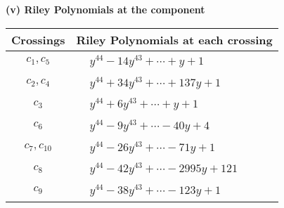 \documentclass[1p]{elsarticle_modified}
\theoremstyle{definition}
\begin{document}
\newpage\renewcommand{\arraystretch}{1}
\flushleft \textbf{(v) Riley Polynomials at the component}\newline \\
\begin{tabular}{m{50pt}|m{274pt}}
Crossings & \hspace{64pt}Riley Polynomials at each crossing \\
\hline $$\begin{aligned}c_{1},c_{5}\end{aligned}$$&$\begin{aligned}
&y^{44}-14 y^{43}+\cdots+y+1
\end{aligned}$\\
\hline $$\begin{aligned}c_{2},c_{4}\end{aligned}$$&$\begin{aligned}
&y^{44}+34 y^{43}+\cdots+137 y+1
\end{aligned}$\\
\hline $$\begin{aligned}c_{3}\end{aligned}$$&$\begin{aligned}
&y^{44}+6 y^{43}+\cdots+y+1
\end{aligned}$\\
\hline $$\begin{aligned}c_{6}\end{aligned}$$&$\begin{aligned}
&y^{44}-9 y^{43}+\cdots-40 y+4
\end{aligned}$\\
\hline $$\begin{aligned}c_{7},c_{10}\end{aligned}$$&$\begin{aligned}
&y^{44}-26 y^{43}+\cdots-71 y+1
\end{aligned}$\\
\hline $$\begin{aligned}c_{8}\end{aligned}$$&$\begin{aligned}
&y^{44}-42 y^{43}+\cdots-2995 y+121
\end{aligned}$\\
\hline $$\begin{aligned}c_{9}\end{aligned}$$&$\begin{aligned}
&y^{44}-38 y^{43}+\cdots-123 y+1
\end{aligned}$\\
\hline
\end{tabular}\\~\\
\end{document}
